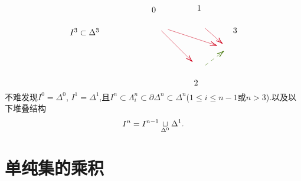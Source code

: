 \[\begin{tikzpicture}[x=0.75pt,y=0.75pt,yscale=-1,xscale=1]
\draw [color={rgb, 255:red, 65; green, 117; blue, 5 }  ,draw opacity=1 ][fill={rgb, 255:red, 65; green, 117; blue, 5 }  ,fill opacity=1 ] [dash pattern={on 4.5pt off 4.5pt}]  (399.33,130.5) -- (427.75,108.72) ;
\draw [shift={(429.33,107.5)}, rotate = 142.52] [color={rgb, 255:red, 65; green, 117; blue, 5 }  ,draw opacity=1 ][line width=0.75]    (10.93,-3.29) .. controls (6.95,-1.4) and (3.31,-0.3) .. (0,0) .. controls (3.31,0.3) and (6.95,1.4) .. (10.93,3.29)   ;
\draw [color={rgb, 255:red, 208; green, 2; blue, 27 }  ,draw opacity=1 ]   (328.83,74.5) -- (377.42,123.09) ;
\draw [shift={(378.83,124.5)}, rotate = 225] [color={rgb, 255:red, 208; green, 2; blue, 27 }  ,draw opacity=1 ][line width=0.75]    (10.93,-3.29) .. controls (6.95,-1.4) and (3.31,-0.3) .. (0,0) .. controls (3.31,0.3) and (6.95,1.4) .. (10.93,3.29)   ;
\draw [color={rgb, 255:red, 208; green, 2; blue, 27 }  ,draw opacity=1 ]   (339.33,72.5) -- (416.43,97.87) ;
\draw [shift={(418.33,98.5)}, rotate = 198.22] [color={rgb, 255:red, 208; green, 2; blue, 27 }  ,draw opacity=1 ][line width=0.75]    (10.93,-3.29) .. controls (6.95,-1.4) and (3.31,-0.3) .. (0,0) .. controls (3.31,0.3) and (6.95,1.4) .. (10.93,3.29)   ;
\draw [color={rgb, 255:red, 208; green, 2; blue, 27 }  ,draw opacity=1 ]   (399.33,70.5) -- (425.84,94.17) ;
\draw [shift={(427.33,95.5)}, rotate = 221.76] [color={rgb, 255:red, 208; green, 2; blue, 27 }  ,draw opacity=1 ][line width=0.75]    (10.93,-3.29) .. controls (6.95,-1.4) and (3.31,-0.3) .. (0,0) .. controls (3.31,0.3) and (6.95,1.4) .. (10.93,3.29)   ;
\draw (385,32.4) node [anchor=north west][inner sep=0.75pt]    {$1$};
\draw (312,35.4) node [anchor=north west][inner sep=0.75pt]    {$0$};
\draw (443,68.4) node [anchor=north west][inner sep=0.75pt]    {$3$};
\draw (380.02,153.17) node [anchor=north west][inner sep=0.75pt]    {$2$};
\draw (180,69.4) node [anchor=north west][inner sep=0.75pt]    {$I^{3} \subset \Delta ^{3}$};
\end{tikzpicture}\]
不难发现$I^0 = \Delta^0$, $I^1 = \Delta^1$,且$I^n \subset \Lambda_i^n \subset \partial \Delta^n \subset \Delta^n$($1\leq i\leq n-1$或$n >3$).以及以下堆叠结构
\[
I^n = I^{n-1} \underset{\Delta^0}{\sqcup}\Delta^1.
\]
\section{单纯集的乘积}
